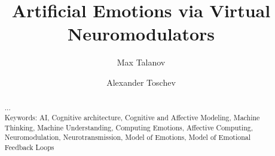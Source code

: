 \documentclass[oribibl]{llncs}
\begin{document}
\title{Artificial Emotions via Virtual Neuromodulators}
\author{Max Talanov \and Alexander Toschev}
\maketitle
\begin{abstract}
...\\
Keywords: AI, Cognitive architecture, Cognitive and Affective Modeling, Machine Thinking, Machine Understanding, Computing Emotions, Affective Computing, Neuromodulation, Neurotransmission, Model of Emotions, Model of Emotional Feedback Loops
\end{abstract}



\end{document}
